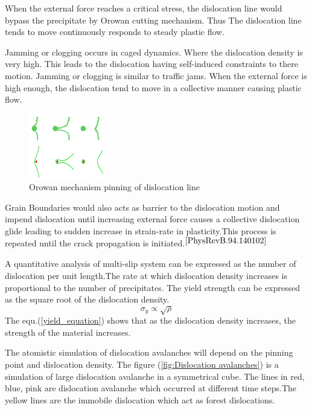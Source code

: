     When the external force reaches a critical stress, the dislocation line would bypass the precipitate by Orowan cutting mechanism. Thus The dislocation line tends to move continuously responds to steady plastic flow.%
     
Jamming or clogging occurs in caged dynamics. Where the dislocation density is very high. This leads to the dislocation having self-induced constraints to there motion. Jamming or clogging is similar to traffic jams. When the external force is high enough, the dislocation tend to move in a collective manner causing plastic flow.%


\begin{figure}
\centering
\includegraphics[width=0.3\textwidth]{section_2_2.png}
\caption{\label{fig:Orowan mechanism}Orowan mechanism pinning of dislocation line}%
\end{figure}

Grain Boundaries would also acts as barrier to the dislocation motion and impend dislocation until increasing external force causes a collective dislocation glide 
leading to sudden increase in strain-rate in plasticity.This process is repeated until the crack propagation is initiated.$^{\cite{PhysRevB.94.140102}
}$


A quantitative analysis of multi-slip system can be expressed as the number of  dislocation per unit length.The rate at which dislocation density increases is proportional to the number of precipitates. The yield strength can be expressed as the square root of the dislocation density. 
\begin{equation}\label{yield_equation}
\sigma_{y} \propto \sqrt{\rho}
\end{equation}
The equ.(\ref{yield_equation}) shows that as the dislocation density increases, the strength of the material increases.


The atomistic simulation of dislocation avalanches will depend on the pinning point and dislocation density.
The figure (\ref{fig:Dislocation avalanches}) is a simulation of large dislocation avalanche in a symmetrical cube. The lines in red, blue, pink are dislocation avalanche which occurred at different time steps.The yellow lines are the immobile dislocation which act as forest dislocations.

